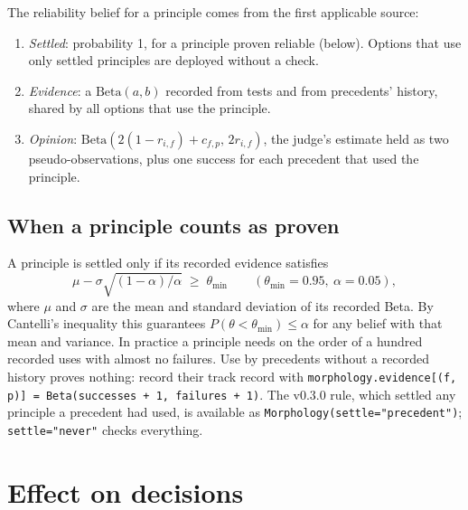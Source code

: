 \documentclass[11pt]{article}
\begin{document}
\noindent The reliability belief for a principle comes from the first applicable source:
\begin{enumerate}
\item \emph{Settled}: probability 1, for a principle proven reliable (below). Options that use only
settled principles are deployed without a check.
\item \emph{Evidence}: a $\mathrm{Beta}(a,b)$ recorded from tests and from precedents' history,
shared by all options that use the principle.
\item \emph{Opinion}: $\mathrm{Beta}(2(1-r_{i,f})+c_{f,p},\,2r_{i,f})$, the judge's estimate held as
two pseudo-observations, plus one success for each precedent that used the principle.
\end{enumerate}

\subsection*{When a principle counts as proven}
A principle is settled only if its recorded evidence satisfies
\[
\mu-\sigma\sqrt{(1-\alpha)/\alpha}\;\ge\;\theta_{\min}\qquad(\theta_{\min}=0.95,\ \alpha=0.05),
\]
where $\mu$ and $\sigma$ are the mean and standard deviation of its recorded Beta. By Cantelli's
inequality this guarantees $P(\theta<\theta_{\min})\le\alpha$ for any belief with that mean and
variance. In practice a principle needs on the order of a hundred recorded uses with almost no
failures. Use by precedents without a recorded history proves nothing: record their track record
with \texttt{morphology.evidence[(f, p)] = Beta(successes + 1, failures + 1)}. The v0.3.0 rule, which
settled any principle a precedent had used, is available as
\texttt{Morphology(settle="precedent")}; \texttt{settle="never"} checks everything.

\section{Effect on decisions}
\end{document}
